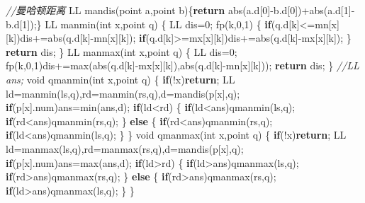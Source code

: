 \documentclass[
]{article}
\newenvironment{Shaded}{}{}
\newcommand{\CommentTok}[1]{\textcolor[rgb]{0.38,0.63,0.69}{\textit{#1}}}
\newcommand{\ControlFlowTok}[1]{\textcolor[rgb]{0.00,0.44,0.13}{\textbf{#1}}}
\newcommand{\DataTypeTok}[1]{\textcolor[rgb]{0.56,0.13,0.00}{#1}}
\newcommand{\DecValTok}[1]{\textcolor[rgb]{0.25,0.63,0.44}{#1}}
\newcommand{\NormalTok}[1]{#1}
\begin{document}
\begin{Shaded}
\begin{Highlighting}[]
\CommentTok{//曼哈顿距离}
\NormalTok{LL mandis(point a,point b)\{}\ControlFlowTok{return}\NormalTok{ abs(a.d[}\DecValTok{0}\NormalTok{]{-}b.d[}\DecValTok{0}\NormalTok{])+abs(a.d[}\DecValTok{1}\NormalTok{]{-}b.d[}\DecValTok{1}\NormalTok{]);\}}
\NormalTok{LL manmin(}\DataTypeTok{int}\NormalTok{ x,point q)}
\NormalTok{\{}
\NormalTok{    LL dis=}\DecValTok{0}\NormalTok{;}
\NormalTok{    fp(k,}\DecValTok{0}\NormalTok{,}\DecValTok{1}\NormalTok{)}
\NormalTok{    \{}
        \ControlFlowTok{if}\NormalTok{(q.d[k]\textless{}=mn[x][k])dis+=abs(q.d[k]{-}mn[x][k]);}
        \ControlFlowTok{if}\NormalTok{(q.d[k]\textgreater{}=mx[x][k])dis+=abs(q.d[k]{-}mx[x][k]);}
\NormalTok{    \}}
    \ControlFlowTok{return}\NormalTok{ dis;}
\NormalTok{\}}
\NormalTok{LL manmax(}\DataTypeTok{int}\NormalTok{ x,point q)}
\NormalTok{\{}
\NormalTok{    LL dis=}\DecValTok{0}\NormalTok{;}
\NormalTok{    fp(k,}\DecValTok{0}\NormalTok{,}\DecValTok{1}\NormalTok{)dis+=max(abs(q.d[k]{-}mx[x][k]),abs(q.d[k]{-}mn[x][k]));}
    \ControlFlowTok{return}\NormalTok{ dis;}
\NormalTok{\}}
\CommentTok{//LL ans;}
\DataTypeTok{void}\NormalTok{ qmanmin(}\DataTypeTok{int}\NormalTok{ x,point q)}
\NormalTok{\{}
    \ControlFlowTok{if}\NormalTok{(!x)}\ControlFlowTok{return}\NormalTok{;}
\NormalTok{    LL ld=manmin(ls,q),rd=manmin(rs,q),d=mandis(p[x],q);}
    \ControlFlowTok{if}\NormalTok{(p[x].num)ans=min(ans,d);}
    \ControlFlowTok{if}\NormalTok{(ld\textless{}rd)}
\NormalTok{    \{}
        \ControlFlowTok{if}\NormalTok{(ld\textless{}ans)qmanmin(ls,q);}
        \ControlFlowTok{if}\NormalTok{(rd\textless{}ans)qmanmin(rs,q);}
\NormalTok{    \}}
    \ControlFlowTok{else}
\NormalTok{    \{}
        \ControlFlowTok{if}\NormalTok{(rd\textless{}ans)qmanmin(rs,q);}
        \ControlFlowTok{if}\NormalTok{(ld\textless{}ans)qmanmin(ls,q);}
\NormalTok{    \}}
\NormalTok{\}}
\DataTypeTok{void}\NormalTok{ qmanmax(}\DataTypeTok{int}\NormalTok{ x,point q)}
\NormalTok{\{}
    \ControlFlowTok{if}\NormalTok{(!x)}\ControlFlowTok{return}\NormalTok{;}
\NormalTok{    LL ld=manmax(ls,q),rd=manmax(rs,q),d=mandis(p[x],q);}
    \ControlFlowTok{if}\NormalTok{(p[x].num)ans=max(ans,d);}
    \ControlFlowTok{if}\NormalTok{(ld\textgreater{}rd)}
\NormalTok{    \{}
        \ControlFlowTok{if}\NormalTok{(ld\textgreater{}ans)qmanmax(ls,q);}
        \ControlFlowTok{if}\NormalTok{(rd\textgreater{}ans)qmanmax(rs,q);}
\NormalTok{    \}}
    \ControlFlowTok{else}
\NormalTok{    \{}
        \ControlFlowTok{if}\NormalTok{(rd\textgreater{}ans)qmanmax(rs,q);}
        \ControlFlowTok{if}\NormalTok{(ld\textgreater{}ans)qmanmax(ls,q);}
\NormalTok{    \}}
\NormalTok{\}}
\end{Highlighting}
\end{Shaded}
\end{document}
